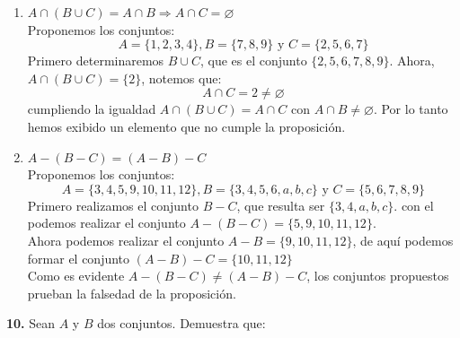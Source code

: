 \documentclass[12pt]{article}
\begin{document}
\begin{enumerate}[label=\alph*)]
    \item $A \cap (B \cup C) = A \cap B \Longrightarrow A \cap C = \varnothing$\\

    Proponemos los conjuntos:
    \[A = \{1, 2, 3, 4\}, B = \{7, 8, 9\} \text{ y } C = \{2, 5, 6, 7\}\]
    Primero determinaremos $B \cup C$, que es el conjunto $\{2, 5, 6, 7, 8, 9\}$. Ahora, $A \cap (B \cup C) = \{2\}$, notemos que:
    \[A \cap C = 2 \neq \varnothing\]
    cumpliendo la igualdad $A \cap (B \cup C) = A \cap C$ con $A \cap B \neq \varnothing$. Por lo tanto hemos exibido un elemento 
    que no cumple la proposición.

    \item $A - (B - C) = (A - B) - C$\\

    Proponemos los conjuntos:
    \[A = \{3, 4, 5, 9, 10, 11, 12\}, B = \{3, 4, 5, 6, a, b, c\} \text{ y } C = \{5, 6, 7, 8, 9\}\]
    Primero realizamos el conjunto $B - C$, que resulta ser $\{3, 4, a, b, c\}$. con el podemos realizar 
    el conjunto $ A - (B - C) = \{5, 9, 10, 11, 12\}$.\\

    Ahora podemos realizar el conjunto $A - B = \{9, 10, 11, 12\}$, de aquí podemos formar el 
    conjunto $(A - B) - C = \{10, 11, 12\}$\\

    Como es evidente $A - (B - C) \neq (A - B) - C$, los conjuntos propuestos prueban la falsedad de la proposición.
\end{enumerate}

%
%
\textbf{10.} Sean $A$ y $B$ dos conjuntos. Demuestra que:
\end{document}
